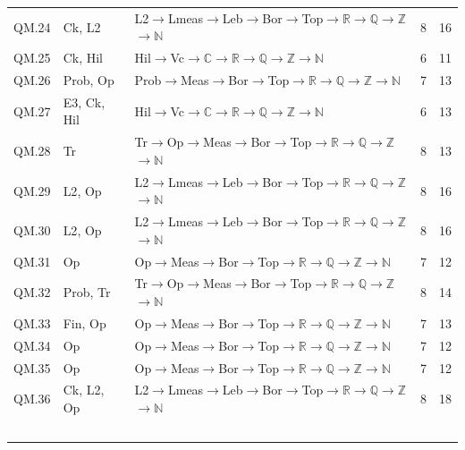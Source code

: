 {\begin{longtable}{l p{4.6cm} p{7.4cm} r r}
QM.24 & \textsf{Ck}, \textsf{L2} & \textsf{L2}$\to$\textsf{Lmeas}$\to$\textsf{Leb}$\to$\textsf{Bor}$\to$\textsf{Top}$\to$$\mathbb R$$\to$$\mathbb Q$$\to$$\mathbb Z$$\to$$\mathbb N$ & 8 & 16 \\
QM.25 & \textsf{Ck}, \textsf{Hil} & \textsf{Hil}$\to$\textsf{Vc}$\to$$\mathbb C$$\to$$\mathbb R$$\to$$\mathbb Q$$\to$$\mathbb Z$$\to$$\mathbb N$ & 6 & 11 \\
QM.26 & \textsf{Prob}, \textsf{Op} & \textsf{Prob}$\to$\textsf{Meas}$\to$\textsf{Bor}$\to$\textsf{Top}$\to$$\mathbb R$$\to$$\mathbb Q$$\to$$\mathbb Z$$\to$$\mathbb N$ & 7 & 13 \\
QM.27 & \textsf{E3}, \textsf{Ck}, \textsf{Hil} & \textsf{Hil}$\to$\textsf{Vc}$\to$$\mathbb C$$\to$$\mathbb R$$\to$$\mathbb Q$$\to$$\mathbb Z$$\to$$\mathbb N$ & 6 & 13 \\
QM.28 & \textsf{Tr} & \textsf{Tr}$\to$\textsf{Op}$\to$\textsf{Meas}$\to$\textsf{Bor}$\to$\textsf{Top}$\to$$\mathbb R$$\to$$\mathbb Q$$\to$$\mathbb Z$$\to$$\mathbb N$ & 8 & 13 \\
QM.29 & \textsf{L2}, \textsf{Op} & \textsf{L2}$\to$\textsf{Lmeas}$\to$\textsf{Leb}$\to$\textsf{Bor}$\to$\textsf{Top}$\to$$\mathbb R$$\to$$\mathbb Q$$\to$$\mathbb Z$$\to$$\mathbb N$ & 8 & 16 \\
QM.30 & \textsf{L2}, \textsf{Op} & \textsf{L2}$\to$\textsf{Lmeas}$\to$\textsf{Leb}$\to$\textsf{Bor}$\to$\textsf{Top}$\to$$\mathbb R$$\to$$\mathbb Q$$\to$$\mathbb Z$$\to$$\mathbb N$ & 8 & 16 \\
QM.31 & \textsf{Op} & \textsf{Op}$\to$\textsf{Meas}$\to$\textsf{Bor}$\to$\textsf{Top}$\to$$\mathbb R$$\to$$\mathbb Q$$\to$$\mathbb Z$$\to$$\mathbb N$ & 7 & 12 \\
QM.32 & \textsf{Prob}, \textsf{Tr} & \textsf{Tr}$\to$\textsf{Op}$\to$\textsf{Meas}$\to$\textsf{Bor}$\to$\textsf{Top}$\to$$\mathbb R$$\to$$\mathbb Q$$\to$$\mathbb Z$$\to$$\mathbb N$ & 8 & 14 \\
QM.33 & \textsf{Fin}, \textsf{Op} & \textsf{Op}$\to$\textsf{Meas}$\to$\textsf{Bor}$\to$\textsf{Top}$\to$$\mathbb R$$\to$$\mathbb Q$$\to$$\mathbb Z$$\to$$\mathbb N$ & 7 & 13 \\
QM.34 & \textsf{Op} & \textsf{Op}$\to$\textsf{Meas}$\to$\textsf{Bor}$\to$\textsf{Top}$\to$$\mathbb R$$\to$$\mathbb Q$$\to$$\mathbb Z$$\to$$\mathbb N$ & 7 & 12 \\
QM.35 & \textsf{Op} & \textsf{Op}$\to$\textsf{Meas}$\to$\textsf{Bor}$\to$\textsf{Top}$\to$$\mathbb R$$\to$$\mathbb Q$$\to$$\mathbb Z$$\to$$\mathbb N$ & 7 & 12 \\
QM.36 & \textsf{Ck}, \textsf{L2}, \textsf{Op} & \textsf{L2}$\to$\textsf{Lmeas}$\to$\textsf{Leb}$\to$\textsf{Bor}$\to$\textsf{Top}$\to$$\mathbb R$$\to$$\mathbb Q$$\to$$\mathbb Z$$\to$$\mathbb N$ & 8 & 18 \\
$$
\end{longtable}}
